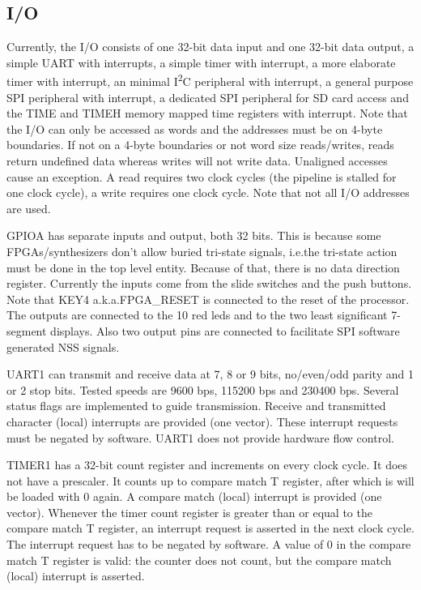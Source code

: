 \documentclass[12pt]{article}
\begin{document}
\subsection{I/O}
\label{sec/io}
Currently, the I/O consists of one 32-bit data input and one 32-bit data output, a simple UART with interrupts, a simple timer with interrupt, a more elaborate timer with interrupt, an minimal I\textsuperscript{2}C peripheral with interrupt, a general purpose SPI peripheral with interrupt, a dedicated SPI peripheral for SD card access and the TIME and TIMEH memory mapped time registers with interrupt. Note that the I/O can only be accessed as words and the addresses must be on 4-byte boundaries. If not on a 4-byte boundaries or not word size reads/writes, reads return undefined data whereas writes will not write data. Unaligned accesses cause an exception. A read requires two clock cycles (the pipeline is stalled for one clock cycle), a write requires one clock cycle. Note that not all I/O addresses are used.

GPIOA has separate inputs and output, both 32 bits. This is because some FPGAs/synthesizers don't allow buried tri-state signals, i.e.\@ the tri-state action must be done in the top level entity. Because of that, there is no data direction register. Currently the inputs come from the slide switches and the push buttons. Note that KEY4 a.k.a.\@ FPGA\_RESET is connected to the reset of the processor. The outputs are connected to the 10 red leds and to the two least significant 7-segment displays. Also two output pins are connected to facilitate SPI software generated NSS signals.

UART1 can transmit and receive data at 7, 8 or 9 bits, no/even/odd parity and 1 or 2 stop bits. Tested speeds are 9600 bps, 115200 bps and 230400 bps. Several status flags are implemented to guide transmission. Receive and transmitted character (local) interrupts are provided (one vector). These interrupt requests must be negated by software. UART1 does not provide hardware flow control.

TIMER1 has a 32-bit count register and increments on every clock cycle. It does not have a prescaler. It counts up to compare match T register, after which is will be loaded with 0 again. A compare match (local) interrupt is provided (one vector). Whenever the timer count register is greater than or equal to the compare match T register, an interrupt request is asserted in the next clock cycle. The interrupt request has to be negated by software. A value of 0 in the compare match T register is valid: the counter does not count, but the compare match (local) interrupt is asserted.
\end{document}

